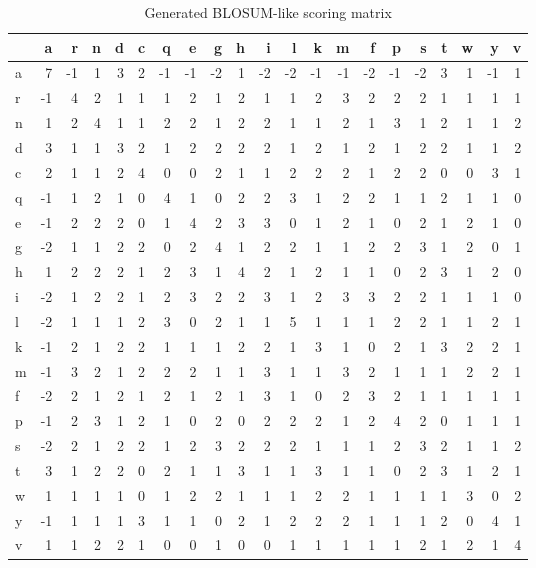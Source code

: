 \documentclass[a4paper,11pt]{article}
\begin{document}
\begin{table}[]
	\centering
	\begin{tabular}{l|*{20}{r} }
		& a  & r  & n & d & c & q  & e  & g  & h & i  & l  & k  & m  & f  & p  & s  & t & w & y  & v \\ \hline
		a & 7  & -1 & 1 & 3 & 2 & -1 & -1 & -2 & 1 & -2 & -2 & -1 & -1 & -2 & -1 & -2 & 3 & 1 & -1 & 1 \\
		r & -1 & 4  & 2 & 1 & 1 & 1  & 2  & 1  & 2 & 1  & 1  & 2  & 3  & 2  & 2  & 2  & 1 & 1 & 1  & 1 \\
		n & 1  & 2  & 4 & 1 & 1 & 2  & 2  & 1  & 2 & 2  & 1  & 1  & 2  & 1  & 3  & 1  & 2 & 1 & 1  & 2 \\
		d & 3  & 1  & 1 & 3 & 2 & 1  & 2  & 2  & 2 & 2  & 1  & 2  & 1  & 2  & 1  & 2  & 2 & 1 & 1  & 2 \\
		c & 2  & 1  & 1 & 2 & 4 & 0  & 0  & 2  & 1 & 1  & 2  & 2  & 2  & 1  & 2  & 2  & 0 & 0 & 3  & 1 \\
		q & -1 & 1  & 2 & 1 & 0 & 4  & 1  & 0  & 2 & 2  & 3  & 1  & 2  & 2  & 1  & 1  & 2 & 1 & 1  & 0 \\
		e & -1 & 2  & 2 & 2 & 0 & 1  & 4  & 2  & 3 & 3  & 0  & 1  & 2  & 1  & 0  & 2  & 1 & 2 & 1  & 0 \\
		g & -2 & 1  & 1 & 2 & 2 & 0  & 2  & 4  & 1 & 2  & 2  & 1  & 1  & 2  & 2  & 3  & 1 & 2 & 0  & 1 \\
		h & 1  & 2  & 2 & 2 & 1 & 2  & 3  & 1  & 4 & 2  & 1  & 2  & 1  & 1  & 0  & 2  & 3 & 1 & 2  & 0 \\
		i & -2 & 1  & 2 & 2 & 1 & 2  & 3  & 2  & 2 & 3  & 1  & 2  & 3  & 3  & 2  & 2  & 1 & 1 & 1  & 0 \\
		l & -2 & 1  & 1 & 1 & 2 & 3  & 0  & 2  & 1 & 1  & 5  & 1  & 1  & 1  & 2  & 2  & 1 & 1 & 2  & 1 \\
		k & -1 & 2  & 1 & 2 & 2 & 1  & 1  & 1  & 2 & 2  & 1  & 3  & 1  & 0  & 2  & 1  & 3 & 2 & 2  & 1 \\
		m & -1 & 3  & 2 & 1 & 2 & 2  & 2  & 1  & 1 & 3  & 1  & 1  & 3  & 2  & 1  & 1  & 1 & 2 & 2  & 1 \\
		f & -2 & 2  & 1 & 2 & 1 & 2  & 1  & 2  & 1 & 3  & 1  & 0  & 2  & 3  & 2  & 1  & 1 & 1 & 1  & 1 \\
		p & -1 & 2  & 3 & 1 & 2 & 1  & 0  & 2  & 0 & 2  & 2  & 2  & 1  & 2  & 4  & 2  & 0 & 1 & 1  & 1 \\
		s & -2 & 2  & 1 & 2 & 2 & 1  & 2  & 3  & 2 & 2  & 2  & 1  & 1  & 1  & 2  & 3  & 2 & 1 & 1  & 2 \\
		t & 3  & 1  & 2 & 2 & 0 & 2  & 1  & 1  & 3 & 1  & 1  & 3  & 1  & 1  & 0  & 2  & 3 & 1 & 2  & 1 \\
		w & 1  & 1  & 1 & 1 & 0 & 1  & 2  & 2  & 1 & 1  & 1  & 2  & 2  & 1  & 1  & 1  & 1 & 3 & 0  & 2 \\
		y & -1 & 1  & 1 & 1 & 3 & 1  & 1  & 0  & 2 & 1  & 2  & 2  & 2  & 1  & 1  & 1  & 2 & 0 & 4  & 1 \\
		v & 1  & 1  & 2 & 2 & 1 & 0  & 0  & 1  & 0 & 0  & 1  & 1  & 1  & 1  & 1  & 2  & 1 & 2 & 1  & 4\\
		\hline
	\end{tabular}
	\caption{Generated BLOSUM-like scoring matrix}
\end{table}
\end{document}
